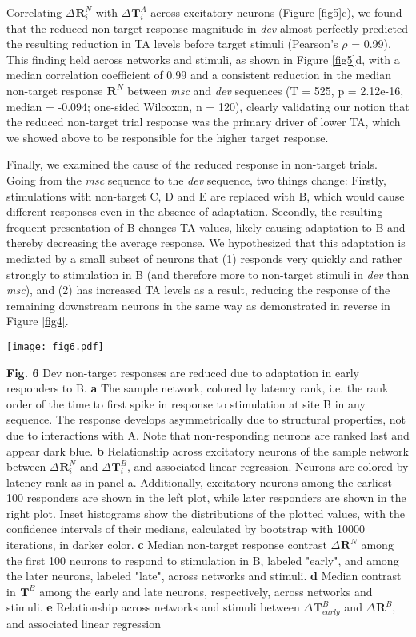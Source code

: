 \documentclass[pdflatex,referee,iicol,sn-basic]{sn-jnl}
\newcommand{\dev}{\textit{dev}}
\newcommand{\msc}{\textit{msc}}
\renewcommand{\R}[3][]{{}^{#1}_{}\mathbf{R}^{#2}_{#3}}
\renewcommand{\T}[3][]{{}^{#1}_{}\mathbf{T}^{#2}_{#3}}
\newcommand{\reffig}[1]{Figure \ref{fig#1}}
\newcommand{\refpanel}[2]{Figure \ref{fig#1}\lowercase{#2}}
\begin{document}
Correlating $\Delta \R{N}{i}$ with $\Delta \T{A}{i}$ across excitatory neurons (\refpanel{5}{c}), we found that the reduced non-target response magnitude in \dev{} almost perfectly predicted the resulting reduction in TA levels before target stimuli (Pearson's $\rho$ = 0.99).
This finding held across networks and stimuli, as shown in \refpanel{5}{d}, with a median correlation coefficient of 0.99 and a consistent reduction in the median non-target response $\R{N}{}$ between \msc{} and \dev{} sequences (T = 525, p = 2.12e-16, median = -0.094; one-sided Wilcoxon, n = 120), clearly validating our notion that the reduced non-target trial response was the primary driver of lower TA, which we showed above to be responsible for the higher target response.

Finally, we examined the cause of the reduced response in non-target trials. Going from the \msc{} sequence to the \dev{} sequence, two things change: Firstly, stimulations with non-target C, D and E are replaced with B, which would cause different responses even in the absence of adaptation. Secondly, the resulting  frequent presentation of B changes TA values, likely causing adaptation to B and thereby decreasing the average response. We hypothesized that this adaptation is mediated by a small subset of neurons that (1) responds very quickly and rather strongly to stimulation in B (and therefore more to non-target stimuli in \dev{} than \msc{}), and (2) has increased TA levels as a result, reducing the response of the remaining downstream neurons in the same way as demonstrated in reverse in \reffig{4}.

\begin{figure*}%
    \centering
    \texttt{[image: fig6.pdf]}
    \caption{}
    \label{fig6}
\end{figure*}
\textbf{Fig. 6} Dev non-target responses are reduced due to adaptation in early responders to B.
\textbf{a} The sample network, colored by latency rank, i.e. the rank order of the time to first spike in response to stimulation at site B in any sequence. The response develops asymmetrically due to structural properties, not due to interactions with A. Note that non-responding neurons are ranked last and appear dark blue.
\textbf{b} Relationship across excitatory neurons of the sample network between $\Delta \R{N}{i}$ and $\Delta \T{B}{i}$, and associated linear regression. Neurons are colored by latency rank as in panel a. Additionally, excitatory neurons among the earliest 100 responders are shown in the left plot, while later responders are shown in the right plot. Inset histograms show the distributions of the plotted values, with the confidence intervals of their medians, calculated by bootstrap with 10000 iterations, in darker color.
\textbf{c} Median non-target response contrast $\Delta \R{N}{}$ among the first 100 neurons to respond to stimulation in B, labeled "early", and among the later neurons, labeled "late", across networks and stimuli.
\textbf{d} Median contrast in $\T{B}{}$ among the early and late neurons, respectively, across networks and stimuli.
\textbf{e} Relationship across networks and stimuli between $\Delta \T{B}{early}$ and $\Delta \R{B}{}$, and associated linear regression
\end{document}
